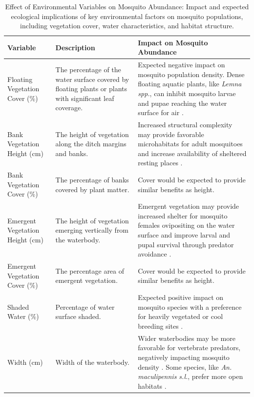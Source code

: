 \documentclass[lineno,sn-basic]{sn-jnl}%
\begin{document}
\begin{table}
\centering
\caption{Effect of Environmental Variables on Mosquito Abundance: Impact and expected ecological implications of key environmental factors on mosquito populations, including vegetation cover, water characteristics, and habitat structure.}
\begin{tabular}{p{3cm}p{6cm}p{7cm}}
\toprule
\textbf{Variable} & \textbf{Description} & \textbf{Impact on Mosquito Abundance} \\
\midrule
Floating Vegetation Cover (\%) & The percentage of the water surface covered by floating plants or plants with significant leaf coverage. & Expected negative impact on mosquito population density. Dense floating aquatic plants, like \textit{Lemna spp.}, can inhibit mosquito larvae and pupae reaching the water surface for air \cite{cuthbertAquaticPlantExtracts2020, eidEffectDuckweedLemna1992}. \\
\addlinespace
Bank Vegetation Height (cm) & The height of vegetation along the ditch margins and banks. & Increased structural complexity may provide favorable microhabitats for adult mosquitoes and increase availability of sheltered resting places \cite{sauerHabitatMicroclimateAffect2021}. \\
\addlinespace
Bank Vegetation Cover (\%) & The percentage of banks covered by plant matter. & Cover would be expected to provide similar benefits as height.\\
\addlinespace
Emergent Vegetation Height (cm) & The height of vegetation emerging vertically from the waterbody. & Emergent vegetation may provide increased shelter for mosquito females ovipositing on the water surface and improve larval and pupal survival through predator avoidance \cite{sahaHabitatComplexityReduces2009}. \\
\addlinespace
Emergent Vegetation Cover (\%) & The percentage area of emergent vegetation. & Cover would be expected to provide similar benefits as height.\\
\addlinespace
Shaded Water (\%) & Percentage of water surface shaded. & Expected positive impact on mosquito species with a preference for heavily vegetated or cool breeding sites \cite{hawkesWetlandMosquitoSurvey2020}. \\
\addlinespace
Width (cm) & Width of the waterbody. & Wider waterbodies may be more favorable for vertebrate predators, negatively impacting mosquito density \cite{sunaharaHabitatSizeFactor2002}. Some species, like \textit{An. maculipennis s.l.}, prefer more open habitats \cite{hawkesWetlandMosquitoSurvey2020}. \\

\end{tabular}
\end{table}
\end{document}
